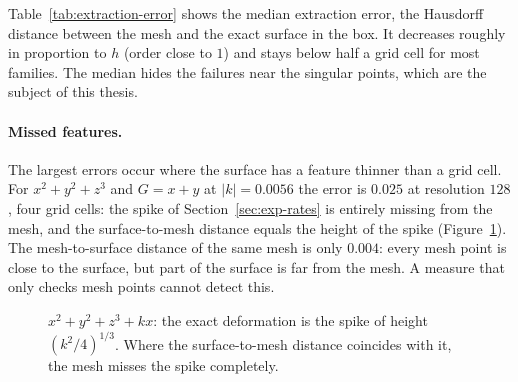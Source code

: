 Table~\ref{tab:extraction-error} shows the median extraction error, the
Hausdorff distance between the mesh and the exact surface in the box. It
decreases roughly in proportion to $h$ (order close to $1$) and stays below
half a grid cell for most families. The median hides the failures near the
singular points, which are the subject of this thesis.


\paragraph{Missed features.} The largest errors occur where the surface has a
feature thinner than a grid cell. For $x^2+y^2+z^3$ and $G=x+y$ at
$|k|=0.0056$ the error is $0.025$ at resolution $128$, four grid cells: the spike
of Section~\ref{sec:exp-rates} is entirely missing from the mesh, and the
surface-to-mesh distance equals the height of the spike
(Figure~\ref{fig:spike}). The mesh-to-surface distance of the same mesh is only
$0.004$: every mesh point is close to the surface, but part of the surface is
far from the mesh. A measure that only checks mesh points cannot detect this.

\begin{figure}[!h]
\centering
{}
\caption[A missed feature]{$x^2+y^2+z^3+kx$: the exact deformation is the
spike of height $(k^2/4)^{1/3}$. Where the surface-to-mesh distance coincides
with it, the mesh misses the spike completely.}
\label{fig:spike}
\end{figure}

